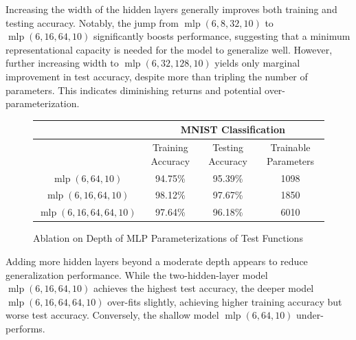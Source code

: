 \documentclass[11pt]{article}
\begin{document}
Increasing the width of the hidden layers generally improves both training and testing accuracy. Notably, the jump from $\operatorname{mlp}(6,8,32,10)$ to $\operatorname{mlp}(6,16,64,10)$ significantly boosts performance, suggesting that a minimum representational capacity is needed for the model to generalize well. However, further increasing width to $\operatorname{mlp}(6,32,128,10)$ yields only marginal improvement in test accuracy, despite more than tripling the number of parameters. This indicates diminishing returns and potential over-parameterization.
\begin{figure}[h!]
    \centering
    \begin{tabular}{|| c | c c c ||} 
      \hline
      &\multicolumn{3}{c||}{MNIST Classification}\\
      \hline
      & Training Accuracy & Testing Accuracy & Trainable Parameters\\
      \hline
      $\operatorname{mlp}(6,64,10)$& 94.75\% &95.39\%&1098\\
      $\operatorname{mlp}(6,16,64,10)$& 98.12\%&97.67\%&1850\\
      $\operatorname{mlp}(6,16,64,64,10)$& 97.64\% & 96.18\% &6010\\
      \hline
    \end{tabular}
  \caption{Ablation on Depth of MLP Parameterizations of Test Functions}\label{tab:ablation_dept}
\end{figure}
Adding more hidden layers beyond a moderate depth appears to reduce generalization performance. While the two-hidden-layer model $\operatorname{mlp}(6,16,64,10)$ achieves the highest test accuracy, the deeper model $\operatorname{mlp}(6,16,64,64,10)$ over-fits slightly, achieving higher training accuracy but worse test accuracy. Conversely, the shallow model $\operatorname{mlp}(6,64,10)$ under-performs.
\end{document}
